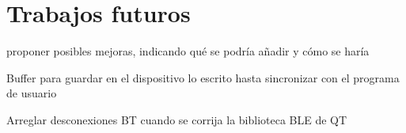 \chapter{Trabajos futuros}
{\color{red} proponer posibles mejoras, indicando qué se podría
añadir y cómo se haría}

{\color{red} Buffer para guardar en el dispositivo lo escrito hasta
sincronizar con el programa de usuario}

{\color{red} Arreglar desconexiones BT cuando se corrija
la biblioteca BLE de QT}
